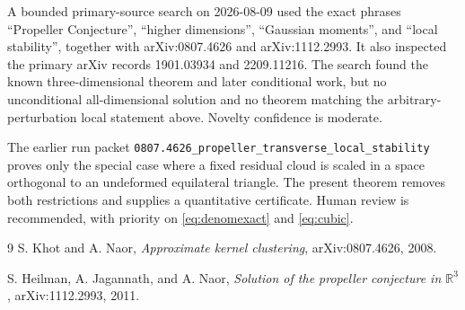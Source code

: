 \documentclass[11pt]{article}
\newcommand{\R}{\mathbb R}
\begin{document}
A bounded primary-source search on 2026-08-09 used the exact phrases
``Propeller Conjecture'', ``higher dimensions'', ``Gaussian moments'', and
``local stability'', together with arXiv:0807.4626 and arXiv:1112.2993.
It also inspected the primary arXiv records 1901.03934 and 2209.11216. The
search found the known three-dimensional theorem and later conditional work,
but no unconditional all-dimensional solution and no theorem matching the
arbitrary-perturbation local statement above. Novelty confidence is moderate.

The earlier run packet
\texttt{0807.4626\_propeller\_transverse\_local\_stability} proves only the
special case where a fixed residual cloud is scaled in a space orthogonal to
an undeformed equilateral triangle. The present theorem removes both
restrictions and supplies a quantitative certificate. Human review is
recommended, with priority on \eqref{eq:denomexact} and
\eqref{eq:cubic}.

\begin{thebibliography}{9}
S. Khot and A. Naor,
\emph{Approximate kernel clustering},
arXiv:0807.4626, 2008.

S. Heilman, A. Jagannath, and A. Naor,
\emph{Solution of the propeller conjecture in $\R^3$},
arXiv:1112.2993, 2011.
\end{thebibliography}
\end{document}
